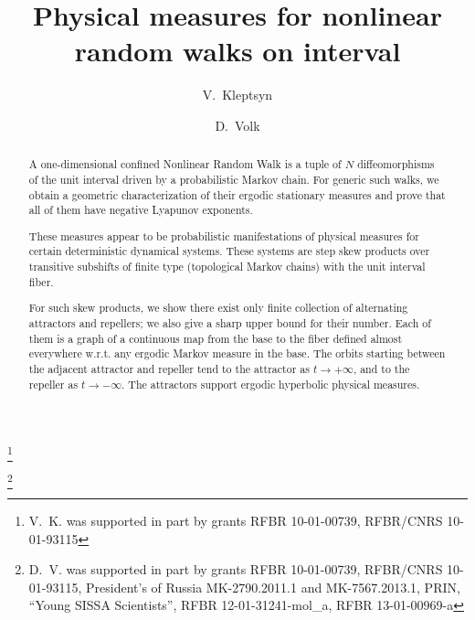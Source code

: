 \documentclass[a4paper,12pt]{amsart}
\begin{document}
\title{Physical measures for nonlinear random walks on interval}

\author{V.~Kleptsyn}
\address{Victor~Kleptsyn
\newline\hphantom{iii} CNRS, Institut de Recherche Mathematique de Rennes (IRMAR, UMR 6625 CNRS)}
\thanks{V.~K. was supported in part by grants RFBR 10-01-00739, RFBR/CNRS 10-01-93115}

\author{{D.~Volk}}
\address{Denis~Volk
\newline\hphantom{iii} University of Rome ``Tor Vergata''
\newline\hphantom{iii} Institute for Information Transmission Problems, Russian Academy of Sciences}
\thanks{D.~V. was supported in part by grants RFBR 10-01-00739, RFBR/CNRS 10-01-93115, President's of Russia MK-2790.2011.1 and MK-7567.2013.1, PRIN, ``Young SISSA Scientists'', RFBR 12-01-31241-mol\_a, RFBR 13-01-00969-a}



\begin{abstract}
A one-dimensional confined Nonlinear Random Walk is a tuple of $N$ diffeomorphisms of the unit interval driven by a probabilistic Markov chain. For generic such walks, we obtain a geometric characterization of their ergodic stationary measures and prove that all of them have negative Lyapunov exponents.

These measures appear to be probabilistic manifestations of physical measures for certain deterministic dynamical systems. These systems are step skew products over transitive subshifts of finite type (topological Markov chains) with the unit interval fiber.

For such skew products, we show there exist only finite collection of alternating attractors and repellers; we also give a sharp upper bound for their number. Each of them is a graph of a continuous map from the base to the fiber defined almost everywhere w.r.t. any ergodic Markov measure in the base. The orbits starting between the adjacent attractor and repeller tend to the attractor as $t \to +\infty$, and to the repeller as $t \to -\infty$. The attractors support ergodic hyperbolic physical measures.
\end{abstract}
\end{document}
